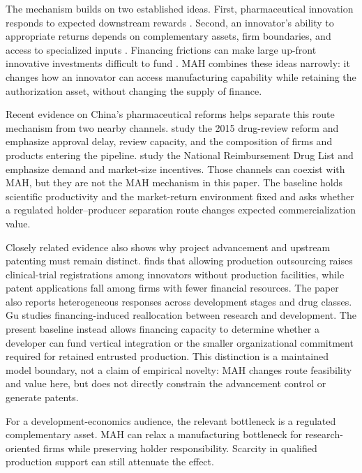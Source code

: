 \documentclass[12pt]{article}
\newcommand{\1}{\mathbf{1}}
\begin{document}
The mechanism builds on two established ideas. First, pharmaceutical
innovation responds to expected downstream rewards
\citep{Schmookler1966,AcemogluLinn2004,Finkelstein2004,DuboisDeMouzonScottMortonSeabright2015,BudishRoinWilliams2015}.
Second, an innovator's ability to appropriate returns depends on complementary
assets, firm boundaries, and access to specialized inputs
\citep{Teece1986,AroraFosfuriGambardella2001,GansStern2003,GrossmanHelpman2002,BolerMoxnesUlltveitMoe2015,Ma2026}.
Financing frictions can make large up-front innovative investments difficult
to fund \citep{HallLerner2010}. MAH combines these ideas narrowly: it changes
how an innovator can access manufacturing capability while retaining the
authorization asset, without changing the supply of finance.

Recent evidence on China's pharmaceutical reforms helps separate this route
mechanism from two nearby channels. \citet{JiaMaYangZhang2023} study the 2015
drug-review reform and emphasize approval delay, review capacity, and the
composition of firms and products entering the pipeline.
\citet{BarwickXiaXia2026} study the National Reimbursement Drug List and
emphasize demand and market-size incentives. Those channels can coexist with
MAH, but they are not the MAH mechanism in this paper. The baseline holds
scientific productivity and the market-return environment fixed and asks
whether a regulated holder--producer separation route changes expected
commercialization value.

Closely related evidence also shows why project advancement and upstream
patenting must remain distinct. \citet{Gu2024} finds that allowing production
outsourcing raises clinical-trial registrations among innovators without
production facilities, while patent applications fall among firms with fewer
financial resources. The paper also reports heterogeneous responses across
development stages and drug classes. Gu studies financing-induced reallocation
between research and development. The present baseline instead allows
financing capacity to determine whether a developer can fund vertical
integration or the smaller organizational commitment required for retained
entrusted production. This distinction is a maintained model boundary, not a
claim of empirical novelty: MAH changes route feasibility and value here, but
does not directly constrain the advancement control or generate patents.

For a development-economics audience, the relevant bottleneck is a regulated
complementary asset. MAH can relax a manufacturing bottleneck for
research-oriented firms while preserving holder responsibility. Scarcity in
qualified production support can still attenuate the effect.
\end{document}
